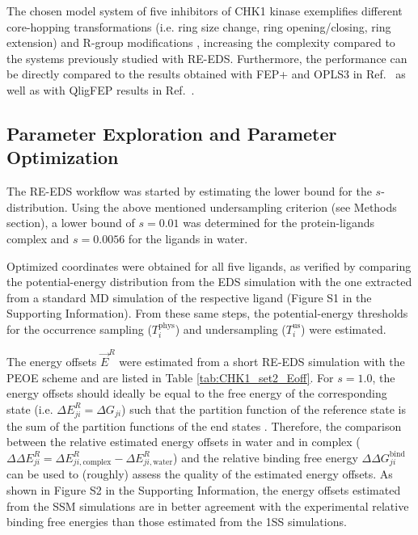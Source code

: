 The chosen model system of five inhibitors of CHK1 kinase exemplifies different core-hopping transformations (i.e. ring size change, ring opening/closing, ring extension) and R-group modifications \cite{Wang2017}, increasing the complexity compared to the systems previously studied with RE-EDS. Furthermore, the performance can be directly compared to the results obtained with FEP+ and OPLS3 in Ref.~\cite{Wang2017} as well as with QligFEP results in Ref.~\cite{Jespers2019}.

\subsection{Parameter Exploration and Parameter Optimization}
The RE-EDS workflow was started by estimating the lower bound for the $s$-distribution. Using the above mentioned undersampling criterion (see Methods section), a lower bound of $s=0.01$ was determined for the protein-ligands complex and $s=0.0056$ for the ligands in water. 

Optimized coordinates were obtained for all five ligands, as verified by comparing the potential-energy distribution from the EDS simulation with the one extracted from a standard MD simulation of the respective ligand (Figure S1 in the Supporting Information). %
From these same steps, the potential-energy thresholds for the occurrence sampling ($T_{i}^{\text{phys}}$) and undersampling ($T_{i}^{\text{us}}$) were estimated.

The energy offsets $\vec{E}^R$ were estimated from a short RE-EDS simulation with the PEOE \cite{Sidler2016} scheme and are listed in Table \ref{tab:CHK1_set2_Eoff}.
For $s=1.0$, the energy offsets should ideally be equal to the free energy of the corresponding state (i.e. $\Delta E^R_{ji} = \Delta G_{ji}$) such that the partition function of the reference state is the sum of the partition functions of the end states \cite{Christ2008}. Therefore, the comparison between the relative estimated energy offsets in water and in complex ($\Delta \Delta E^R_{ji} = \Delta E^R_{ji,\text{complex}} - \Delta E^R_{ji,\text{water}}$) and the relative binding free energy $\Delta \Delta G^\text{bind}_{ji}$ can be used to (roughly) assess the quality of the estimated energy offsets. As shown in Figure S2 in the Supporting Information, %
the energy offsets estimated from the SSM simulations are in better agreement with the experimental relative binding free energies than those estimated from the 1SS simulations.

